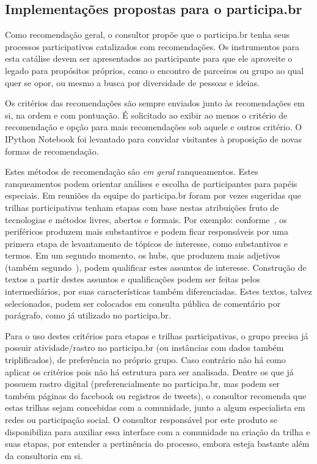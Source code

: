 \documentclass[12pt]{article}
\begin{document}
\subsection{Implementações propostas para o participa.br}\label{sec:props}

Como recomendação geral, o consultor propõe que o participa.br tenha seus processos participativos catalizados com recomendações. Os instrumentos para
esta catálise devem ser apresentados ao participante para que ele aproveite o legado para propósitos próprios, como o encontro de parceiros ou grupo ao qual quer se opor, ou mesmo a busca por diversidade de pessoas e ideias.

Os critérios das recomendações são sempre enviados junto às recomendações em si, na ordem e com pontuação. É solicitado ao exibir ao menos o critério de recomendação e opção para mais recomendações sob aquele e outros critério. O IPython Notebook foi levantado para convidar visitantes à proposição de novas formas de recomendação.

Estes métodos de recomendação são \emph{em geral} ranqueamentos. Estes ranqueamentos podem orientar análises e escolha de participantes para papéis especiais. Em reuniões da equipe do participa.br foram por vezes sugeridas que trilhas participativas tenham etapas com base nestas atribuições fruto de tecnologias e métodos livres, abertos e formais. Por exemplo: conforme~\cite{fabbri2}, os periféricos produzem mais substantivos e podem ficar responsáveis por uma primera etapa de levantamento de tópicos de interesse, como substantivos e termos. Em um segundo momento, os hubs, que produzem mais adjetivos (também segundo~\cite{fabbri2}), podem qualificar estes assuntos de interesse. Construção de textos a partir destes assuntos e qualificações podem ser feitas pelos intermediários, por suas características também diferenciadas. Estes textos, talvez selecionados, podem ser colocados em consulta pública de comentário por parágrafo, como já utilizado no participa.br.

Para o uso destes critérios para etapas e trilhas participativas, o grupo precisa já possuir atividade/rastro no participa.br (ou instâncias com dados também triplificados), de preferência no próprio grupo. Caso contrário não há como aplicar os critérios pois não há estrutura para ser analisada. Dentre os que já possuem rastro digital (preferencialmente no participa.br, mas podem ser também páginas do facebook ou registros de tweets), o consultor recomenda que estas trilhas sejam concebidas com a comunidade, junto a algum especialista em redes ou participação social. O consultor responsável por este produto se disponibiliza para auxiliar essa interface com a comunidade na criação da trilha e suas etapas, por entender a pertinência do processo, embora esteja bastante além da consultoria em si.
\end{document}
